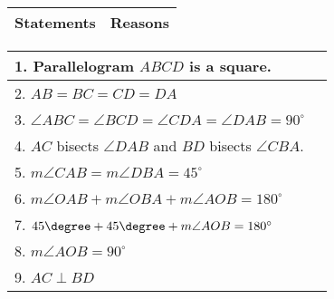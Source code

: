 \begin{center}
\begin{tabularx}{\textwidth}{|Y|Y|}
\hline
\textbf{Statements} & \textbf{Reasons}  \\
\hline
\end{tabularx} 
\begin{tabularx}{\textwidth}{|X|X|}
\hline
1. Parallelogram \( ABCD \) is a square. & \\
\hline
2. \( AB = BC = CD = DA \) & \\
\hline
3. \( \angle ABC = \angle BCD = \angle CDA = \angle DAB = 90^\circ \) & \\
\hline
4. \( AC \) bisects \(\angle DAB\) and \( BD \) bisects \(\angle CBA\). & \\
\hline
5. \( m\angle CAB = m\angle DBA = 45^\circ \) & \\
\hline
6. \( m\angle OAB + m\angle OBA + m\angle AOB = 180^\circ \) & \\
\hline
7. \( 45\degree + 45\degree + m\angle AOB = 180^\circ \) & \\
\hline
8. \(  m\angle AOB = 90^\circ \) & \\
\hline
9. \( AC \perp BD \) & \\
\hline
\end{tabularx}
\end{center}


